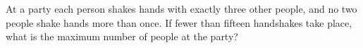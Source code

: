 At a party each person shakes hands with exactly three other people, and no two people shake hands more than once. If fewer than fifteen handshakes take place, what is the maximum number of people at the party?
